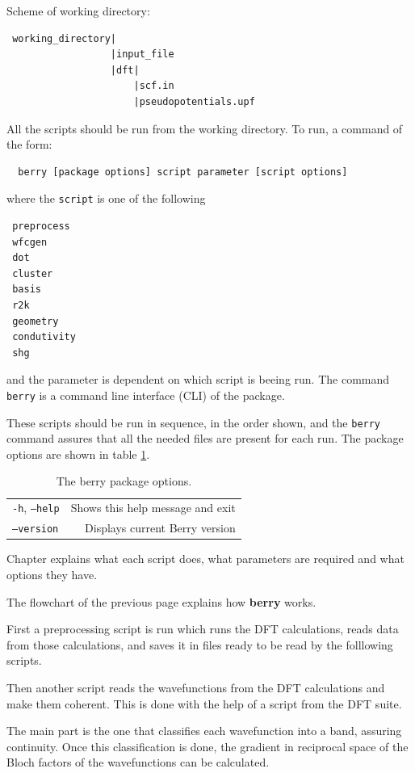 \documentclass[a4paper,12pt]{report}
\begin{document}
Scheme of working directory:
\begin{verbatim}
 working_directory|
                  |input_file
                  |dft|
                      |scf.in
                      |pseudopotentials.upf
\end{verbatim}
\bigskip

 All the scripts should be run from the working directory.
 To run, a command of the form:
 \begin{verbatim}
  berry [package options] script parameter [script options]
 \end{verbatim}
where the \texttt{script} is one of the following
\begin{verbatim}
 preprocess
 wfcgen
 dot
 cluster
 basis
 r2k
 geometry
 condutivity
 shg
\end{verbatim}
and the parameter is dependent on which script is beeing run.
The command \texttt{berry} is a command line interface (CLI) of the package.

These scripts should be run in sequence, in the order shown, and the \texttt{berry} command assures
that all the needed files are present for each run.
The package options are shown in table \ref{tab:package_options}.

\begin{table}[h]
 \centering
 \caption{The berry package options.}\label{tab:package_options}
\begin{tabular}[]{lr}
\hline
  \texttt{-h}, \texttt{--help}     &    Shows this help message and exit \\
  \texttt{--version}               &    Displays current Berry version \\
\hline
\end{tabular}
\bigskip
\end{table}

Chapter  explains what each script does,
what parameters are required and what options they have.


The flowchart of the previous page explains how \textbf{berry} works.

First a preprocessing script is run which runs the DFT calculations, reads data from those
calculations, and saves it in files ready to be read by the folllowing scripts.

Then another script reads the wavefunctions from the DFT calculations and make them coherent.
This is done with the help of a script from the DFT suite.

The main part is the one that classifies each wavefunction into a band, assuring continuity.
Once this classification is done, the gradient in reciprocal space of the Bloch factors
of the wavefunctions can be calculated.
\end{document}
